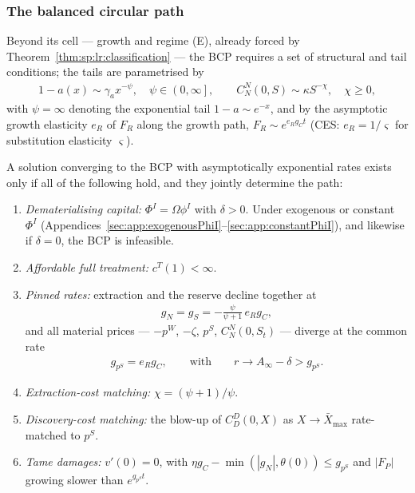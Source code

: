\subsubsection{The balanced circular path}\label{sec:sp:longrun:path:bcp}

Beyond its cell --- growth and regime (E), already forced by
Theorem~\ref{thm:sp:lr:classification} --- the BCP requires a set of structural and tail
conditions; the tails are parametrised by
\begin{align}
1-a(x)\sim\gamma_ax^{-\psi},\quad\psi\in\left(0,\infty\right],
\qquad
C^N_N\left(0,S\right)\sim\kappa S^{-\chi},\quad\chi\ge0,
\label{eq:sp:lr:tails}
\end{align}
with $\psi=\infty$ denoting the exponential tail $1-a\sim e^{-x}$, and by the asymptotic growth
elasticity $e_R$ of $F_R$ along the growth path, $F_R\sim e^{e_Rg_Ct}$ (CES: $e_R=1/\varsigma$
for substitution elasticity $\varsigma$).

\begin{proposition}\label{prop:sp:lr:bcp}
A solution converging to the BCP with asymptotically exponential rates exists only if all of the
following hold, and they jointly determine the path:
\begin{enumerate}
    \item \emph{Dematerialising capital:} $\Phi^I=\Omega\phi^I$ with $\delta>0$. Under exogenous
    or constant $\Phi^I$ (Appendices~\ref{sec:app:exogenousPhiI}--\ref{sec:app:constantPhiI}),
    and likewise if $\delta=0$, the BCP is infeasible.
    \item \emph{Affordable full treatment:} $c^T(1)<\infty$.
    \item \emph{Pinned rates:} extraction and the reserve decline together at
    \begin{align}
    g_N=g_S=-\frac{\psi}{\psi+1}\,e_Rg_C,
    \label{eq:sp:lr:gN}
    \end{align}
    and all material prices --- $-p^W$, $-\zeta$, $p^S$, $C^N_N\left(0,S_t\right)$ --- diverge
    at the common rate
    \begin{align}
    g_{p^S}=e_Rg_C,
    \qquad\text{with}\qquad
    r\to A_\infty-\delta>g_{p^S}.
    \label{eq:sp:lr:gp}
    \end{align}
    \item \emph{Extraction-cost matching:} $\chi=\left(\psi+1\right)/\psi$.
    \item \emph{Discovery-cost matching:} the blow-up of $C^D_D\left(0,X\right)$ as
    $X\to\bar X_{\max}$ rate-matched to $p^S$.
    \item \emph{Tame damages:} $v'(0)=0$, with
    $\eta g_C-\min\left(\left|g_N\right|,\theta(0)\right)\le g_{p^S}$ and $\left|F_P\right|$
    growing slower than $e^{g_{p^S}t}$.
\end{enumerate}
\end{proposition}

